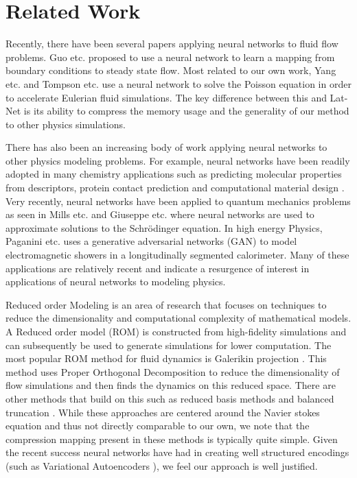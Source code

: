 \documentclass{article}
\begin{document}
\section{Related Work}

Recently, there have been several papers applying neural networks to fluid flow problems. Guo etc. \cite{guo2016convolutional} proposed to use a neural network to learn a mapping from boundary conditions to steady state flow. Most related to our own work, Yang etc. \cite{yang2016data} and Tompson etc. \cite{tompson2016accelerating} use a neural network to solve the Poisson equation in order to accelerate Eulerian fluid simulations. The key difference between this and Lat-Net is its ability to compress the memory usage and the generality of our method to other physics simulations.

There has also been an increasing body of work applying neural networks to other physics modeling problems. For example, neural networks have been readily adopted in many chemistry applications such as predicting molecular properties from descriptors, protein contact prediction and computational material design \cite{goh2017deep}. Very recently, neural networks have been applied to quantum mechanics problems as seen in Mills etc. \cite{mills2017deep} and Giuseppe etc. \cite{carleo2017solving} where neural networks are used to approximate solutions to the Schrödinger equation. In high energy Physics, Paganini etc. \cite{2017arXiv170502355P} uses a generative adversarial networks (GAN)\cite{goodfellow2014generative} to model electromagnetic showers in a longitudinally segmented calorimeter. Many of these applications are relatively recent and indicate a resurgence of interest in applications of neural networks to modeling physics.

Reduced order Modeling is an area of research that focuses on techniques to reduce the dimensionality and computational complexity of mathematical models. A Reduced order model (ROM) is constructed from high-fidelity simulations and can subsequently be used to generate simulations for lower computation. The most popular ROM method for fluid dynamics is Galerikin projection \cite{rowley2004model} \cite{barone2009reduced}. This method uses Proper Orthogonal Decomposition to reduce the dimensionality of flow simulations and then finds the dynamics on this reduced space. There are other methods that build on this such as reduced basis methods and balanced truncation \cite{veroy2005certified} \cite{rowley2005model}. While these approaches are centered around the Navier stokes equation and thus not directly comparable to our own, we note that the compression mapping present in these methods is typically quite simple. Given the recent success neural networks have had in creating well structured encodings (such as Variational Autoencoders \cite{kingma2013auto} \cite{watter2015embed}), we feel our approach is well justified.
\end{document}
